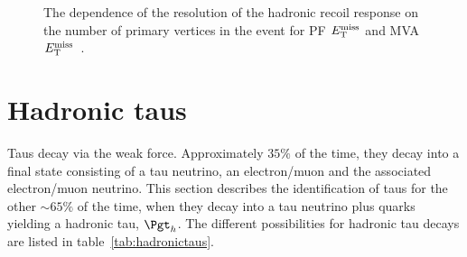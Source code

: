 \begin{figure}
\begin{center}
\end{center}
\caption[The dependence of the resolution of the hadronic
recoil response on the number of primary vertices in the event for PF
$\MET$ and MVA $\MET$.]
{The dependence of the resolution of the hadronic
recoil response on the number of primary vertices in the event for \ac{PF}
$\MET$ and MVA $\MET$~\cite{CMS-PAS-JME-12-002}.
}
\label{fig:mvamet}
\end{figure}

\section{Hadronic taus}
\label{sec:taus}

Taus decay via the weak force. Approximately $35\%$ of the time, they decay into a final state consisting of a tau
neutrino, an electron/muon and the associated electron/muon neutrino. 
This section describes the identification of taus for the other $\sim65\%$ of the time,
when they decay into a tau neutrino plus quarks yielding a hadronic tau, $\Pgth$. The different
possibilities for hadronic tau decays are listed in table~\ref{tab:hadronictaus}.

